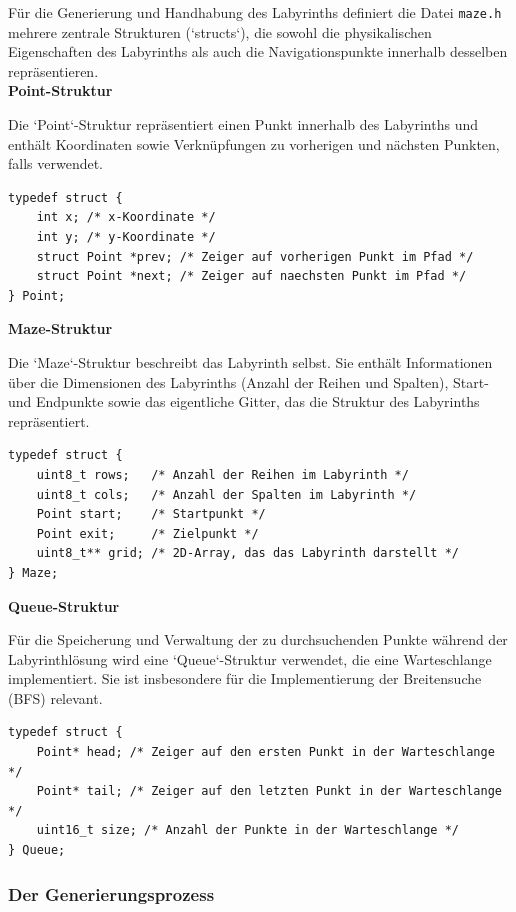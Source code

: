 Für die Generierung und Handhabung des Labyrinths definiert die Datei \texttt{maze.h} mehrere zentrale Strukturen (`structs`), die sowohl die physikalischen Eigenschaften des Labyrinths als auch die Navigationspunkte innerhalb desselben repräsentieren. \\

\noindent \textbf{Point-Struktur}

Die `Point`-Struktur repräsentiert einen Punkt innerhalb des Labyrinths und enthält Koordinaten sowie Verknüpfungen zu vorherigen und nächsten Punkten, falls verwendet.

\begin{lstlisting}[style=CStyle]
typedef struct {
    int x; /* x-Koordinate */
    int y; /* y-Koordinate */
    struct Point *prev; /* Zeiger auf vorherigen Punkt im Pfad */
    struct Point *next; /* Zeiger auf naechsten Punkt im Pfad */
} Point;
\end{lstlisting}

\noindent \textbf{Maze-Struktur}

Die `Maze`-Struktur beschreibt das Labyrinth selbst. Sie enthält Informationen über die Dimensionen des Labyrinths (Anzahl der Reihen und Spalten), Start- und Endpunkte sowie das eigentliche Gitter, das die Struktur des Labyrinths repräsentiert.

\begin{lstlisting}[style=CStyle]
typedef struct {
    uint8_t rows;   /* Anzahl der Reihen im Labyrinth */
    uint8_t cols;   /* Anzahl der Spalten im Labyrinth */
    Point start;    /* Startpunkt */
    Point exit;     /* Zielpunkt */
    uint8_t** grid; /* 2D-Array, das das Labyrinth darstellt */
} Maze;
\end{lstlisting}

\noindent \textbf{Queue-Struktur}

Für die Speicherung und Verwaltung der zu durchsuchenden Punkte während der Labyrinthlösung wird eine `Queue`-Struktur verwendet, die eine Warteschlange implementiert. Sie ist insbesondere für die Implementierung der Breitensuche (BFS) relevant.

\begin{lstlisting}[style=CStyle]
typedef struct {
    Point* head; /* Zeiger auf den ersten Punkt in der Warteschlange */
    Point* tail; /* Zeiger auf den letzten Punkt in der Warteschlange */
    uint16_t size; /* Anzahl der Punkte in der Warteschlange */
} Queue;
\end{lstlisting}

\subsubsection{Der Generierungsprozess}

